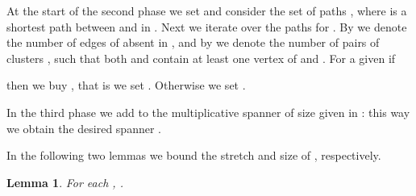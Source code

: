\documentclass[a4paper,11pt]{article}
\newtheorem{lemma}{Lemma}[section]
\theoremstyle{definition}
\begin{document}
At the start of the second phase we set  and consider the set of paths  , where  
is a shortest path between  and  in .
Next we iterate over the paths  for  .
By  we denote the number of edges of 
absent in , and by  we denote the number of 
pairs of clusters , such that both  and  contain at
least one vertex of  and .
For a given  if

then we buy , that is we set . Otherwise we set .

In the third phase we add to  the multiplicative  spanner of size  given in \cite{HZ96}: this way we obtain the desired spanner .






In the following two lemmas we bound the stretch and size of , respectively.

\begin{lemma}
\label{lem:stretchPairwise1}
For each , .
\end{lemma}
\end{document}

